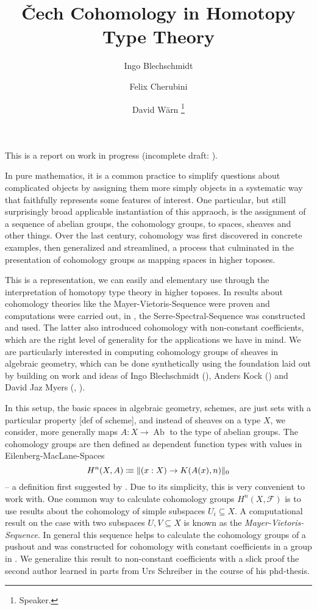 \documentclass[letterpaper]{../util/easychair}
\title{\v{C}ech Cohomology in Homotopy Type Theory
}
\author{
Ingo Blechschmidt \inst{1}
\and 
 Felix Cherubini \inst{1}
\and 
 David Wärn \inst{1}
 \thanks{Speaker.}
}
\institute{
  \email{iblech@speicherleck.de}
\and
  University of Gothenburg\\
  \email{felix.cherubini@posteo.de}
\and
  University of Gothenburg\\
  \email{warnd@chalmers.se}
}
\DeclareMathOperator{\AbGroup}{Ab}
\newcommand{\notion}[1]{\emph{#1}\index{#1}}
\providecommand*\colonequiv{\vcentcolon\mspace{-1.2mu}\equiv}
\begin{document}
\maketitle

This is a report on work in progress (incomplete draft: \cite{chech-draft}).

In pure mathematics,
it is a common practice to simplify questions about complicated objects
by assigning them more simply objects in a systematic way that faithfully represents some features of interest.
One particular, but still surprisingly broad applicable instantiation of this appraoch,
is the assignment of a sequence of abelian groups, the cohomology groups, to spaces, sheaves and other things.
Over the last century, cohomology was first discovered in concrete examples, then generalized and streamlined,
a process that culminated in the presentation of cohomology groups as mapping spaces in higher toposes.

This is a representation, we can easily and elementary use through the interpretation of homotopy type theory in higher toposes.
In \cite{evan-master-thesis} results about cohomology theories like the Mayer-Vietoris-Sequence were proven and computations were carried out,
in \cite{floris-thesis}, the Serre-Spectral-Sequence was constructed and used.
The latter also introduced cohomology with non-constant coefficients,
which are the right level of generality for the applications we have in mind.
We are particularly interested in computing cohomology groups of sheaves in algebraic geometry,
which can be done synthetically using the foundation laid out by \cite{draft}
building on work and ideas of Ingo Blechschmidt (\cite{ingo-thesis}), Anders Kock (\cite{kock-sdg})
and David Jaz Myers (\cite{myers-talk1}, \cite{myers-talk2}).

In this setup, the basic spaces in algebraic geometry, schemes, are just sets with a particular property \cite{draft}[def of scheme],
and instead of sheaves on a type $X$, we consider, more generally maps $A:X\to\AbGroup$ to the type of abelian groups.
The cohomology groups are then defined as dependent function types with values in Eilenberg-MacLane-Spaces
\[ H^n(X,A)\colonequiv \|(x:X)\to K(A(x),n)\|_0\]
-- a definition first suggested by \cite{mike-blogpost}.
Due to its simplicity, this is very convenient to work with.
One common way to calculate cohomology groups $H^n(X,\mathcal F)$ is to
use results about the cohomology of simple subspaces $U_i\subseteq X$.
A computational result on the case with two subspaces $U,V\subseteq X$ is known as the \notion{Mayer-Vietoris-Sequence}.
In general this sequence helps to calculate the cohomology groups of a pushout
and was constructed for cohomology with constant coefficients in a group in \cite{evan-master-thesis}.
We generalize this result to non-constant coefficients
with a slick proof the second author learned in parts from Urs Schreiber in the course of his phd-thesis.
\end{document}
